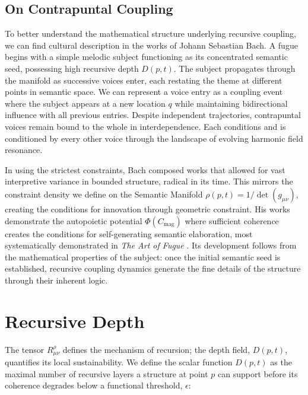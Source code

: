 
\subsection{On Contrapuntal Coupling}
\label{4.2.1:on_contrapuntal_coupling}

To better understand the mathematical structure underlying recursive coupling, we can find cultural description in the works of Johann Sebastian Bach. A fugue begins with a simple melodic subject functioning as its concentrated semantic seed, possessing high recursive depth \(D(p,t)\). The subject propagates through the manifold as successive voices enter, each restating the theme at different points in semantic space. We can represent a voice entry as a coupling event where the subject appears at a new location \(q\) while maintaining bidirectional influence with all previous entries. Despite independent trajectories, contrapuntal voices remain bound to the whole in interdependence. Each conditions and is conditioned by every other voice through the landscape of evolving harmonic field resonance.

In using the strictest constraints, Bach composed works that allowed for vast interpretive variance in bounded structure, radical in its time. This mirrors the constraint density we define on the Semantic Manifold \(\rho(p,t) = 1/\det(g_{\mu\nu})\), creating the conditions for innovation through geometric constraint. His works demonstrate the autopoietic potential \(\Phi(C_{\text{mag}})\) where sufficient coherence creates the conditions for self-generating semantic elaboration, most systematically demonstrated in \textit{The Art of Fugue} \autocite{Bach1751}. Its development follows from the mathematical properties of the subject: once the initial semantic seed is established, recursive coupling dynamics generate the fine details of the structure through their inherent logic.


\section{Recursive Depth}
\label{4.3:recursive_depth}

The tensor \(R^\rho_{\mu\nu}\) defines the mechanism of recursion; the depth field, \(D(p, t)\), quantifies its local sustainability. We define the scalar function \(D(p,t)\) as the maximal number of recursive layers a structure at point \(p\) can support before its coherence degrades below a functional threshold, \(\epsilon\):

